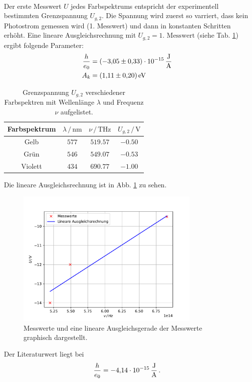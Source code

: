 \\
Der erste Messwert $U$ jedes Farbspektrums entspricht der experimentell bestimmten Grenzspannung $U_{g,2}$.
Die Spannung wird zuerst so varriert, dass kein Photostrom gemessen wird (1. Messwert) und dann in konstanten Schritten erhöht.
Eine lineare Ausgleichsrechnung mit $U_{g,2} = 1. \text{ Messwert}$ (siehe Tab. \ref{tab:grenzspannung_2}) ergibt folgende Parameter:
\begin{align*}
  \frac{h}{e_0} &= \SI{-3.05(33)e-15}{\frac{\joule}{\ampere}} \\
  A_k &= \SI{1.11(20)}{\electronvolt}
\end{align*}

\begin{table}
  \centering
  \begin{tabular}{c|ccc}
    \toprule
    Farbspektrum & $\lambda \,/\, \si{\nano\metre}$ & $\nu \,/\, \si{\tera\hertz}$ & $U_{g,2} \,/\, \si{\volt}$ \\
    \midrule
    Gelb & $577$ & $519.57$ & $-0.50$ \\
    Grün & $546$ & $549.07$ & $-0.53$ \\
    Violett & $434$ & $690.77$ & $-1.00$ \\
    \bottomrule
  \end{tabular}
  \caption{Grenzspannung $U_{g,2}$ verschiedener Farbspektren mit Wellenlänge $\lambda$ und Frequenz $\nu$ aufgelistet.}
  \label{tab:grenzspannung_2}
\end{table}
Die lineare Ausgleichsrechnung ist in Abb. \ref{fig:grenzspannung_2} zu sehen.
\begin{figure}
  \centering
  \includegraphics[width=0.8\textwidth]{content/data/grenzspannung_ausgleich.pdf}
  \caption{Messwerte und eine lineare Ausgleichsgerade der Messwerte graphisch dargestellt. \cite{matplotlib}\cite{scipy}\cite{numpy}\cite{uncertainties}}
  \label{fig:grenzspannung_2}
\end{figure}
Der Literaturwert \cite{konstanten} liegt bei
\begin{equation*}
  \frac{h}{e_0} = \SI{-4.14e-15}{\frac{\joule}{\ampere}} \,.
\end{equation*}
